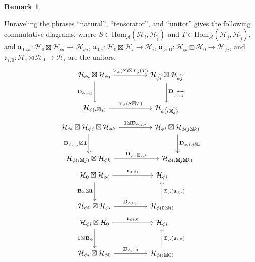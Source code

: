 \documentclass[11pt,b5paper,notitlepage]{article}
\theoremstyle{definition}
\newtheorem{rem}[df]{Remark}
\theoremstyle{plain}
\newcommand{\fk}{\mathfrak}
\newcommand{\wtd}{\widetilde}
\newcommand{\idt}{\mathbf{1}}
\newcommand{\Hom}{\mathrm{Hom}}
\newcommand{\mbf}{\mathbf}
\newcommand{\MA}{\mathcal A}
\newcommand{\MH}{\mathcal H}
\numberwithin{equation}{section}
\begin{document}
\begin{rem}
\begin{enumerate}[label=(\alph*)]
Unraveling the phrases ``natural'', ``tensorator'', and ``unitor'' gives the following commutative diagrams, where $S\in\Hom_\MA(\MH_i,\MH_{\wtd i})$ and $T\in\Hom_\MA(\MH_j,\MH_{\wtd j})$, and $\fk u_{0,\phi i}:\MH_0\boxtimes\MH_{\phi i}\rightarrow\MH_{\phi i}$, $\fk u_{0,i}:\MH_0\boxtimes\MH_i\rightarrow\MH_i$, $\fk u_{\phi i,0}:\MH_{\phi i}\boxtimes \MH_0\rightarrow\MH_{\phi i}$, and $\fk u_{i,0}:\MH_i\boxtimes\MH_0\rightarrow\MH_i$ are the unitors.
\begin{subequations}\label{eq12}
\begin{gather}
\begin{tikzcd}[column sep=huge,row sep=large,ampersand replacement=\&]
\MH_{\phi i}\boxtimes\MH_{\phi j} \arrow[r,"\fk T_\phi(S)\boxtimes\fk T_\phi(T)"] \arrow[d,"\mbf D_{\phi,i,j}"'] \& \MH_{\phi \wtd i}\boxtimes\MH_{\phi \wtd j} \arrow[d,"\mbf D_{\phi,\wtd i,\wtd j}"] \\
\MH_{\phi(i\boxtimes j)}  \arrow[r,"\fk T_\phi(S\boxtimes T)"]           \& \MH_{\phi(\wtd i\boxtimes \wtd j)}        
\end{tikzcd}\label{eq12a}\\
\begin{tikzcd}[column sep=huge,row sep=large,ampersand replacement=\&]
\MH_{\phi i}\boxtimes\MH_{\phi j}\boxtimes\MH_{\phi k} \arrow[r,"\idt\boxtimes \mbf D_{\phi,j,k}"] \arrow[d,"\mbf D_{\phi,i,j}\boxtimes\idt"'] \& \MH_{\phi i}\boxtimes\MH_{\phi (j\boxtimes k)} \arrow[d,"\mbf D_{\phi,i,j\boxtimes k}"] \\
\MH_{\phi(i\boxtimes j)}\boxtimes\MH_{\phi k}  \arrow[r,"\mbf D_{\phi,i\boxtimes j,k}"]           \& \MH_{\phi(i\boxtimes j\boxtimes k)}        
\end{tikzcd}\label{eq12b}\\
\begin{tikzcd}[column sep=huge,row sep=large,ampersand replacement=\&]
\MH_0\boxtimes\MH_{\phi i} \arrow[r,"\fk u_{0,\phi i}"] \arrow[d,"\mbf B_\phi\boxtimes\idt"'] \& \MH_{\phi i}  \\
\MH_{\phi 0}\boxtimes\MH_{\phi i}  \arrow[r,"\mbf D_{\phi,0,i}"]           \& \MH_{\phi(0\boxtimes i)}        \arrow[u,"\fk T_\phi(\fk u_{0,i})"']
\end{tikzcd}\label{eq12c}\\
\begin{tikzcd}[column sep=huge,row sep=large,ampersand replacement=\&]
\MH_{\phi i} \boxtimes\MH_0\arrow[r,"\fk u_{\phi i,0}"] \arrow[d,"\idt\boxtimes\mbf B_\phi"'] \& \MH_{\phi i}  \\
\MH_{\phi i}\boxtimes\MH_{\phi 0}  \arrow[r,"\mbf D_{\phi,i,0}"]           \& \MH_{\phi(i\boxtimes 0)}        \arrow[u,"\fk T_\phi(\fk u_{i,0})"']

\end{tikzcd}
\end{gather}
\end{subequations}
\end{enumerate}
\end{rem}
\end{document}
